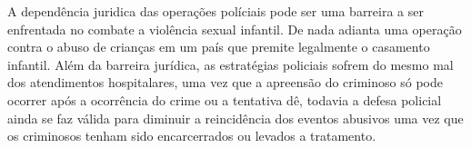









A dependência juridica das operações políciais pode ser uma barreira a ser enfrentada no combate a violência sexual infantil. De nada adianta uma operação contra o abuso de crianças em um país que premite legalmente o casamento infantil. Além da barreira jurídica, as estratégias policiais sofrem do mesmo mal dos atendimentos hospitalares, uma vez que a apreensão do criminoso só pode ocorrer após a ocorrência do crime ou a tentativa dê, todavia a defesa policial ainda se faz válida para diminuir a reincidência dos eventos abusivos uma vez que os criminosos tenham sido encarcerrados ou levados a tratamento. 



